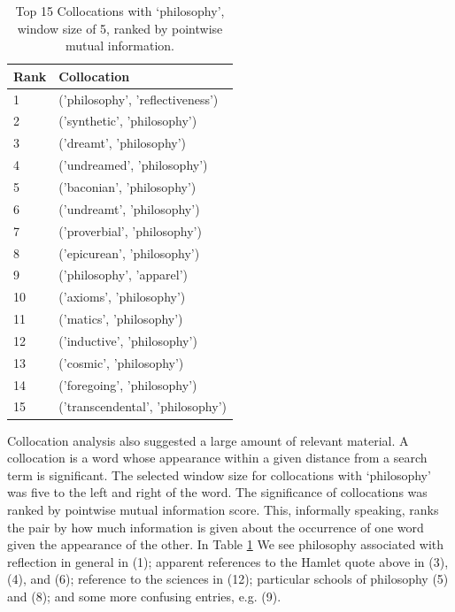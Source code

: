 \documentclass{article}
\begin{document}
\begin{table}[]
        \footnotesize
        \centering
        \begin{tabular}{l|l}
          Rank & Collocation  \\
          \hline
        1 & ('philosophy', 'reflectiveness') \\
        2 & ('synthetic', 'philosophy') \\
        3 & ('dreamt', 'philosophy') \\
        4 & ('undreamed', 'philosophy') \\
        5 & ('baconian', 'philosophy') \\
        6 & ('undreamt', 'philosophy') \\
        7 & ('proverbial', 'philosophy') \\
        8 & ('epicurean', 'philosophy') \\
        9 & ('philosophy', 'apparel') \\
        10 & ('axioms', 'philosophy') \\
        11 & ('matics', 'philosophy') \\
        12 & ('inductive', 'philosophy') \\
        13 & ('cosmic', 'philosophy') \\
        14 & ('foregoing', 'philosophy') \\
        15 & ('transcendental', 'philosophy') \\
        \end{tabular}
        \caption{Top 15 Collocations with `philosophy', window size of 5, ranked by pointwise mutual information.}
        \label{t:corpus-collocation}
\end{table}

Collocation analysis also suggested a large amount of relevant material. A collocation is a word whose appearance within a given distance from a search term is significant. The selected window size for collocations with `philosophy' was five to the left and right of the word. The significance of  collocations was ranked by pointwise mutual information score. This, informally speaking, ranks the pair by how much information is given about the occurrence of one word given the appearance of the other. In Table \ref{t:corpus-collocation} We see philosophy associated with reflection in general in (1); apparent references to the Hamlet quote above in (3), (4), and (6); reference to the sciences in (12); particular schools of philosophy (5) and (8); and some more confusing entries, e.g. (9).
\end{document}
